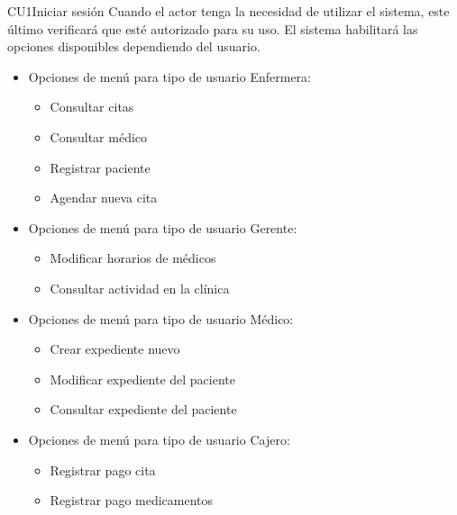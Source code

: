 \begin{UseCase}{CU1}{Iniciar sesión}{
		Cuando el actor tenga la necesidad de utilizar el sistema, este último verificará que esté autorizado para su uso. El sistema habilitará las opciones disponibles dependiendo del usuario.}
{\begin{itemize}
       	\item Opciones de menú para tipo de usuario Enfermera:
			\begin{itemize}
				\item Consultar citas
                \item Consultar médico
				\item Registrar paciente
                \item Agendar nueva cita
			\end{itemize}
        \item Opciones de menú para tipo de usuario Gerente:
			\begin{itemize}
				\item Modificar horarios de médicos
                \item Consultar actividad en la clínica
			\end{itemize}
       \item Opciones de menú para tipo de usuario Médico:
			\begin{itemize}
				\item Crear expediente nuevo
                \item Modificar expediente del paciente
				\item Consultar expediente del paciente
			\end{itemize}
       \item Opciones de menú para tipo de usuario Cajero:
			\begin{itemize}
                \item Registrar pago cita
				\item Registrar pago medicamentos
			\end{itemize}   
	\end{itemize}
    }
\end{UseCase}

